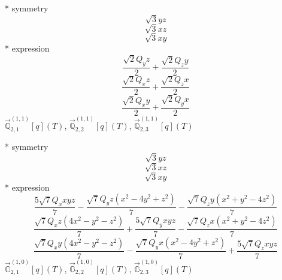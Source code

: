 \documentclass[fleqn,8pt]{jsarticle}
\begin{document}
\noindent\quad ** symmetry
\begin{dmath*}
\sqrt{3} y z
\end{dmath*}
\begin{dmath*}
\sqrt{3} x z
\end{dmath*}
\begin{dmath*}
\sqrt{3} x y
\end{dmath*}
\noindent\quad ** expression
\begin{dmath*}
\frac{\sqrt{2} Q_{y} z}{2} + \frac{\sqrt{2} Q_{z} y}{2}
\end{dmath*}
\begin{dmath*}
\frac{\sqrt{2} Q_{x} z}{2} + \frac{\sqrt{2} Q_{z} x}{2}
\end{dmath*}
\begin{dmath*}
\frac{\sqrt{2} Q_{x} y}{2} + \frac{\sqrt{2} Q_{y} x}{2}
\end{dmath*}
\noindent\quad $\vec{\mathbb{Q}}_{2,1}^{(1,1)}[q](T)$, $\vec{\mathbb{Q}}_{2,2}^{(1,1)}[q](T)$, $\vec{\mathbb{Q}}_{2,3}^{(1,1)}[q](T)$

\noindent\quad ** symmetry
\begin{dmath*}
\sqrt{3} y z
\end{dmath*}
\begin{dmath*}
\sqrt{3} x z
\end{dmath*}
\begin{dmath*}
\sqrt{3} x y
\end{dmath*}
\noindent\quad ** expression
\begin{dmath*}
\frac{5 \sqrt{7} Q_{x} x y z}{7} - \frac{\sqrt{7} Q_{y} z \left(x^{2} - 4 y^{2} + z^{2}\right)}{7} - \frac{\sqrt{7} Q_{z} y \left(x^{2} + y^{2} - 4 z^{2}\right)}{7}
\end{dmath*}
\begin{dmath*}
\frac{\sqrt{7} Q_{x} z \left(4 x^{2} - y^{2} - z^{2}\right)}{7} + \frac{5 \sqrt{7} Q_{y} x y z}{7} - \frac{\sqrt{7} Q_{z} x \left(x^{2} + y^{2} - 4 z^{2}\right)}{7}
\end{dmath*}
\begin{dmath*}
\frac{\sqrt{7} Q_{x} y \left(4 x^{2} - y^{2} - z^{2}\right)}{7} - \frac{\sqrt{7} Q_{y} x \left(x^{2} - 4 y^{2} + z^{2}\right)}{7} + \frac{5 \sqrt{7} Q_{z} x y z}{7}
\end{dmath*}
\noindent\quad $\vec{\mathbb{G}}_{2,1}^{(1,0)}[q](T)$, $\vec{\mathbb{G}}_{2,2}^{(1,0)}[q](T)$, $\vec{\mathbb{G}}_{2,3}^{(1,0)}[q](T)$
\end{document}
